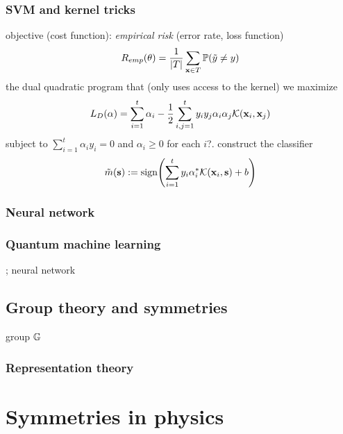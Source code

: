 \subsubsection{SVM and kernel tricks}
objective (cost function): \emph{empirical risk} (error rate, loss function)
\begin{equation}
	R_{emp}(\vb{\theta}) = \frac{1}{\abs{T}}
	\sum_{\vb{x}\in T} \mathbb{P} (\tilde{y} \neq y)
\end{equation}
the dual quadratic program that (only uses access to the kernel)
we maximize 
\begin{equation}
	L_D(\alpha) = \sum_{i=1}^t \alpha_i - \frac{1}{2}\sum_{i,j=1}^t y_i y_j \alpha_i \alpha_j \mathcal{K}(\vb{x}_i,\vb{x}_j)
\end{equation}
subject to $\sum_{i=1}^t \alpha_i y_i = 0$ and $\alpha_i\ge 0$ for each $i$?.
construct the classifier
\begin{equation}
	\tilde{m}(\vb{s}) := \textup{sign} \qty(
		\sum_{i=1}^t y_i \alpha_i^* \mathcal{K}(\vb{x}_i,\vb{s}) + b
	)
\end{equation}

\subsubsection{Neural network}

\subsubsection{Quantum machine learning}\label{sec:quantum_machine_learning}
\cite{biamonteQuantumMachineLearning2017}; neural network

\subsection{Group theory and symmetries}
group $\mathbb{G}$

\subsubsection{Representation theory}\label{sec:representation_theory}

\section{Symmetries in physics}
